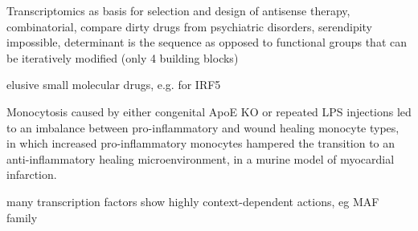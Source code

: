 Transcriptomics as basis for selection and design of antisense therapy, combinatorial, compare dirty drugs from psychiatric disorders, serendipity impossible, determinant is the sequence as opposed to functional groups that can be iteratively modified (only 4 building blocks)

elusive small molecular drugs, e.g. for IRF5 \cite{Almuttaqi2019}

Monocytosis caused by either congenital ApoE KO or repeated LPS injections led to an imbalance between pro-inflammatory and wound healing monocyte types, in which increased pro-inflammatory monocytes hampered the transition to an anti-inflammatory healing microenvironment, in a murine model of myocardial infarction.\cite{Panizzi2010}

many transcription factors show highly context-dependent actions, eg MAF family \cite{Hamada2020}
